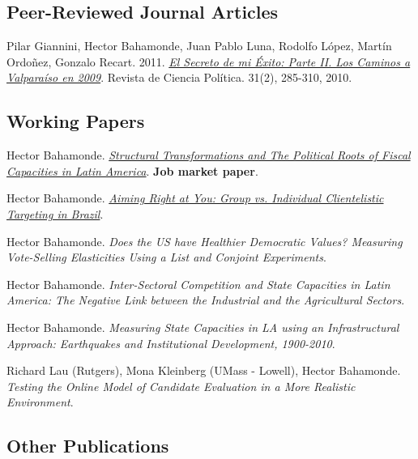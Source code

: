 \documentclass[letterpaper]{article}
\renewenvironment{itemize}{
  \begin{list}{}{
    \setlength{\leftmargin}{1.5em}
  }
}{
  \end{list}
}
\begin{document}
\subsection*{Peer-Reviewed Journal Articles}

\begin{itemize}
\item Pilar Giannini, Hector Bahamonde, Juan Pablo Luna, Rodolfo L\'opez, Mart\'in Ordo\~nez, Gonzalo Recart. 2011. \href{http://www.revistacienciapolitica.cl/rcp/wp-content/uploads/2013/09/07_vol_31_2.pdf}{\emph{El Secreto de mi \'Exito: Parte II. Los Caminos a Valpara\'iso en 2009}}. Revista de Ciencia Pol\'itica. 31(2), 285-310, 2010.
\end{itemize}



\subsection*{Working Papers}

\begin{itemize}
\item Hector Bahamonde. \href{https://github.com/hbahamonde/IncomeTaxAdoption/raw/Summer_2016/Bahamonde_IncomeTaxAdoption.pdf}{\emph{Structural Transformations and The Political Roots of Fiscal Capacities in Latin America}}. {\bf Job market paper}.
\item Hector Bahamonde. \href{https://github.com/hbahamonde/Clientelism_paper/raw/LARR_Revisions/Bahamonde_Clientelism_Paper.pdf}{\emph{Aiming Right at You: Group vs. Individual Clientelistic Targeting in Brazil}}.
\item Hector Bahamonde. \emph{Does the US have Healthier Democratic Values? Measuring Vote-Selling Elasticities Using a List and Conjoint Experiments}.
\item Hector Bahamonde. \emph{Inter-Sectoral Competition and State Capacities in Latin America: The Negative Link between the Industrial and the Agricultural Sectors}.
\item Hector Bahamonde. \emph{Measuring State Capacities in LA using an Infrastructural Approach: Earthquakes and Institutional Development, 1900-2010}.
\item Richard Lau (Rutgers), Mona Kleinberg (UMass - Lowell), Hector Bahamonde. \emph{Testing the Online Model of Candidate Evaluation in a More Realistic Environment}.
\end{itemize}

\subsection*{Other Publications}
\end{document}
